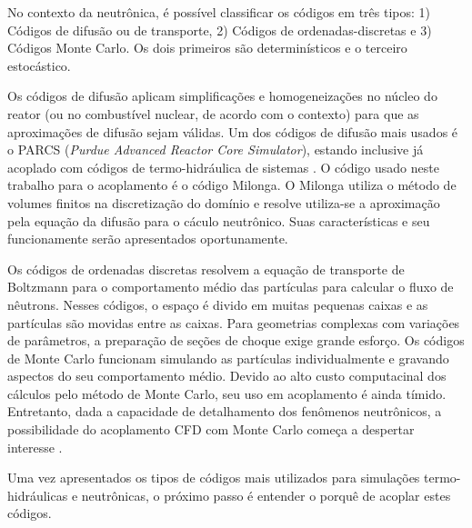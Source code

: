 No contexto da neutrônica, é possível classificar os códigos em três tipos:
1) Códigos de difusão ou de transporte, 
2) Códigos de ordenadas-discretas e 3) Códigos Monte Carlo. Os dois primeiros são determinísticos 
e o terceiro estocástico. 

Os códigos de difusão aplicam simplificações e homogeneizações no núcleo do reator (ou no combustível nuclear, 
de acordo com o contexto) para que as aproximações de difusão sejam válidas. Um dos códigos de difusão 
mais usados é o PARCS (\textit{Purdue Advanced Reactor Core Simulator}), estando inclusive já acoplado 
com códigos de termo-hidráulica de sistemas \cite{Xu2006,Barber98}.
O código usado neste trabalho para o acoplamento é o código Milonga\cite{ThelerXXX}. O Milonga
utiliza o método de volumes finitos na discretização do domínio e resolve utiliza-se a
aproximação pela equação da difusão para o cáculo neutrônico. Suas características e seu
funcionamente serão apresentados oportunamente.

Os códigos de ordenadas discretas resolvem 
a equação de transporte de Boltzmann para o comportamento médio das partículas para calcular o 
fluxo de nêutrons. Nesses códigos, o espaço é divido em muitas pequenas caixas e as partículas 
são movidas entre as caixas. Para geometrias complexas com variações de parâmetros, a preparação de 
seções de choque exige grande esforço. Os códigos de Monte Carlo funcionam simulando as partículas 
individualmente e gravando aspectos do seu comportamento médio. Devido ao alto custo computacinal 
dos cálculos pelo método de Monte Carlo, seu uso em acoplamento é ainda tímido. Entretanto, dada a capacidade de detalhamento dos fenômenos neutrônicos, a possibilidade do acoplamento CFD com Monte Carlo começa a despertar interesse \cite{Leppanen2012}.

Uma vez apresentados os tipos de códigos mais utilizados para simulações termo-hidráulicas
e neutrônicas, o próximo passo é entender o porquê de acoplar estes códigos.

%

